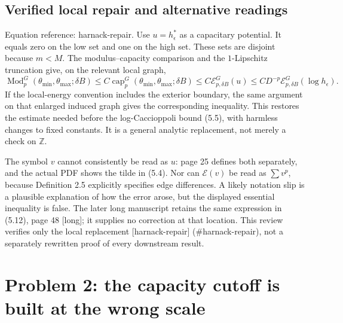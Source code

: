 \documentclass[10pt]{article}
\begin{document}
\subsection*{Verified local repair and alternative readings}
Equation reference: harnack-repair. Use \(u=h_\epsilon^*\) as a capacitary potential. It equals zero on the low set and one on the high set. These sets are disjoint because \(m<M\). The modulus–capacity comparison and the \(1\)-Lipschitz truncation give, on the relevant local graph, \[
 \operatorname{Mod}_p^G(\theta_{\min},\theta_{\max};\delta B)
 \le C\operatorname{cap}_p^G(\theta_{\min},\theta_{\max};\delta B)
 \le C\mathcal E^G_{p,\delta B}(u)
 \le C D^{-p}\mathcal E^G_{p,\delta B}(\log h_\epsilon).\] If the local-energy convention includes the exterior boundary, the same argument on that enlarged induced graph gives the corresponding inequality. This restores the estimate needed before the log-Caccioppoli bound (5.5), with harmless changes to fixed constants. It is a general analytic replacement, not merely a check on \(\mathbb Z\).\par
The symbol \(v\) cannot consistently be read as \(u\): page 25 defines both separately, and the actual PDF shows the tilde in (5.4). Nor can \(\mathcal E(v)\) be read as \(\sum v^p\), because Definition 2.5 explicitly specifies edge differences. A likely notation slip is a plausible explanation of how the error arose, but the displayed essential inequality is false. The later long manuscript retains the same expression in (5.12), page 48 [long]; it supplies no correction at that location. This review verifies only the local replacement [harnack-repair] (\#harnack-repair), not a separately rewritten proof of every downstream result.\par
\section*{Problem 2: the capacity cutoff is built at the wrong scale}
\end{document}
